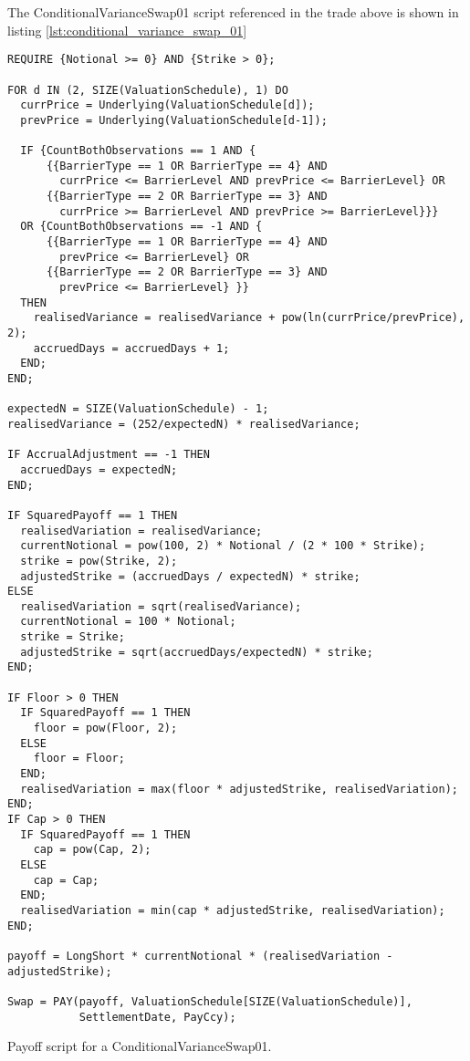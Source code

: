 The ConditionalVarianceSwap01 script referenced in the trade above is shown in listing
\ref{lst:conditional_variance_swap_01}

\begin{listing}[hbt]
\begin{verbatim}
REQUIRE {Notional >= 0} AND {Strike > 0};

FOR d IN (2, SIZE(ValuationSchedule), 1) DO
  currPrice = Underlying(ValuationSchedule[d]);
  prevPrice = Underlying(ValuationSchedule[d-1]);

  IF {CountBothObservations == 1 AND {
      {{BarrierType == 1 OR BarrierType == 4} AND
        currPrice <= BarrierLevel AND prevPrice <= BarrierLevel} OR
      {{BarrierType == 2 OR BarrierType == 3} AND
        currPrice >= BarrierLevel AND prevPrice >= BarrierLevel}}}
  OR {CountBothObservations == -1 AND {
      {{BarrierType == 1 OR BarrierType == 4} AND
        prevPrice <= BarrierLevel} OR 
      {{BarrierType == 2 OR BarrierType == 3} AND
        prevPrice <= BarrierLevel} }}
  THEN
    realisedVariance = realisedVariance + pow(ln(currPrice/prevPrice), 2);
    accruedDays = accruedDays + 1;
  END;
END;

expectedN = SIZE(ValuationSchedule) - 1;
realisedVariance = (252/expectedN) * realisedVariance;

IF AccrualAdjustment == -1 THEN
  accruedDays = expectedN;
END;

IF SquaredPayoff == 1 THEN
  realisedVariation = realisedVariance;
  currentNotional = pow(100, 2) * Notional / (2 * 100 * Strike);
  strike = pow(Strike, 2);
  adjustedStrike = (accruedDays / expectedN) * strike;
ELSE
  realisedVariation = sqrt(realisedVariance);
  currentNotional = 100 * Notional;
  strike = Strike;
  adjustedStrike = sqrt(accruedDays/expectedN) * strike;
END;

IF Floor > 0 THEN
  IF SquaredPayoff == 1 THEN
    floor = pow(Floor, 2);
  ELSE
    floor = Floor;
  END;
  realisedVariation = max(floor * adjustedStrike, realisedVariation);
END;
IF Cap > 0 THEN
  IF SquaredPayoff == 1 THEN
    cap = pow(Cap, 2);
  ELSE
    cap = Cap;
  END;
  realisedVariation = min(cap * adjustedStrike, realisedVariation);
END;

payoff = LongShort * currentNotional * (realisedVariation - adjustedStrike);

Swap = PAY(payoff, ValuationSchedule[SIZE(ValuationSchedule)],
           SettlementDate, PayCcy);
\end{verbatim}
\caption{Payoff script for a ConditionalVarianceSwap01.}
\label{lst:conditional_variance_swap_01}
\end{listing}

